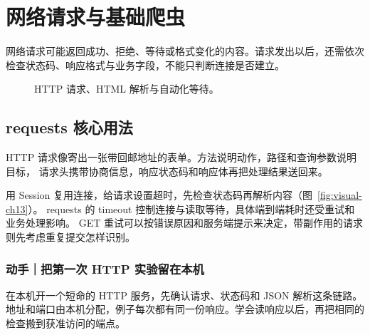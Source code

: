 \chapter{网络请求与基础爬虫}
\label{ch:13-outline}

网络请求可能返回成功、拒绝、等待或格式变化的内容。请求发出以后，还需依次检查状态码、响应格式与业务字段，不能只判断连接是否建立。


\begin{figure}[htbp]
  \centering
  \caption*{HTTP 请求、HTML 解析与自动化等待。}
\end{figure}


\section{requests 核心用法}

HTTP 请求像寄出一张带回邮地址的表单。方法说明动作，路径和查询参数说明目标，
请求头携带协商信息，响应状态码和响应体再把处理结果送回来。

用 Session 复用连接，给请求设置超时，先检查状态码再解析内容（图~\ref{fig:visual-ch13}）。
requests 的 timeout 控制连接与读取等待，具体端到端耗时还受重试和业务处理影响。
GET 重试可以按错误原因和服务端提示来决定，带副作用的请求则先考虑重复提交怎样识别。

\subsection*{动手｜把第一次 HTTP 实验留在本机}

在本机开一个短命的 HTTP 服务，先确认请求、状态码和 JSON 解析这条链路。地址和端口由本机分配，例子每次都有同一份响应。学会读响应以后，再把相同的检查搬到获准访问的端点。

